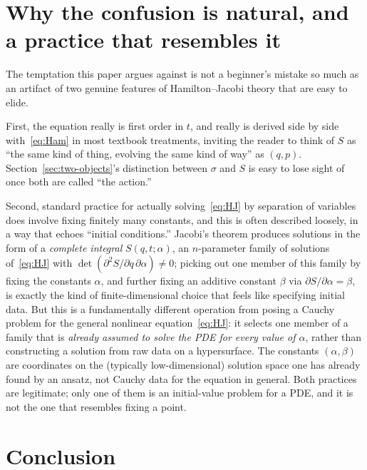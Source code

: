 \documentclass[11pt]{article}
\begin{document}
\section{Why the confusion is natural, and a practice that resembles it}
\label{sec:discussion}

The temptation this paper argues against is not a beginner's mistake so much as an artifact of two genuine features of Hamilton--Jacobi theory that are easy to elide.

First, the equation really is first order in $t$, and really is derived side by side with~\eqref{eq:Ham} in most textbook treatments, inviting the reader to think of $S$ as ``the same kind of thing, evolving the same kind of way'' as $(q,p)$. Section~\ref{sec:two-objects}'s distinction between $\sigma$ and $S$ is easy to lose sight of once both are called ``the action.''

Second, standard practice for actually solving~\eqref{eq:HJ} by separation of variables does involve fixing finitely many constants, and this is often described loosely, in a way that echoes ``initial conditions.'' Jacobi's theorem produces solutions in the form of a \emph{complete integral} $S(q,t;\alpha)$, an $n$-parameter family of solutions of~\eqref{eq:HJ} with $\det(\partial^2S/\partial q\,\partial\alpha)\neq0$; picking out one member of this family by fixing the constants $\alpha$, and further fixing an additive constant $\beta$ via $\partial S/\partial\alpha=\beta$, is exactly the kind of finite-dimensional choice that feels like specifying initial data. But this is a fundamentally different operation from posing a Cauchy problem for the general nonlinear equation~\eqref{eq:HJ}: it selects one member of a family that is \emph{already assumed to solve the PDE for every value of $\alpha$}, rather than constructing a solution from raw data on a hypersurface. The constants $(\alpha,\beta)$ are coordinates on the (typically low-dimensional) solution space one has already found by an ansatz, not Cauchy data for the equation in general. Both practices are legitimate; only one of them is an initial-value problem for a PDE, and it is not the one that resembles fixing a point.

\section{Conclusion}
\label{sec:conclusion}
\end{document}
